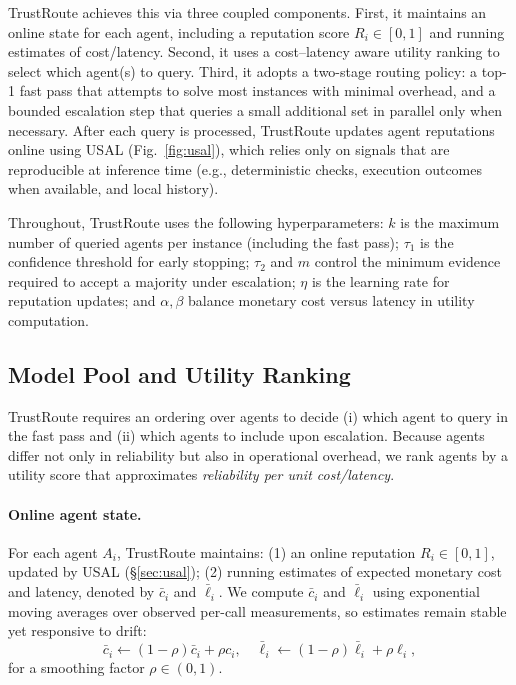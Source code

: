 \documentclass[acmsmall,screen,review,anonymous]{acmart}
\begin{document}
TrustRoute achieves this via three coupled components.
First, it maintains an online state for each agent, including a reputation score $R_i\in[0,1]$ and running estimates of cost/latency.
Second, it uses a cost--latency aware utility ranking to select which agent(s) to query.
Third, it adopts a two-stage routing policy:
a top-1 fast pass that attempts to solve most instances with minimal overhead,
and a bounded escalation step that queries a small additional set in parallel only when necessary.
After each query is processed, TrustRoute updates agent reputations online using USAL (Fig.~\ref{fig:usal}),
which relies only on signals that are reproducible at inference time (e.g., deterministic checks, execution outcomes when available, and local history).

Throughout, TrustRoute uses the following hyperparameters:
$k$ is the maximum number of queried agents per instance (including the fast pass);
$\tau_1$ is the confidence threshold for early stopping;
$\tau_2$ and $m$ control the minimum evidence required to accept a majority under escalation;
$\eta$ is the learning rate for reputation updates; and
$\alpha,\beta$ balance monetary cost versus latency in utility computation.

\subsection{Model Pool and Utility Ranking}
\label{sec:ranking}
TrustRoute requires an ordering over agents to decide (i) which agent to query in the fast pass and (ii) which agents to include upon escalation.
Because agents differ not only in reliability but also in operational overhead, we rank agents by a utility score that approximates
\emph{reliability per unit cost/latency}.

\paragraph{Online agent state.}
For each agent $A_i$, TrustRoute maintains:
(1) an online reputation $R_i\in[0,1]$, updated by USAL (\S\ref{sec:usal});
(2) running estimates of expected monetary cost and latency, denoted by $\bar{c}_i$ and $\bar{\ell}_i$.
We compute $\bar{c}_i$ and $\bar{\ell}_i$ using exponential moving averages over observed per-call measurements,
so estimates remain stable yet responsive to drift:
\[
\bar{c}_i \leftarrow (1-\rho)\bar{c}_i + \rho c_i,\quad
\bar{\ell}_i \leftarrow (1-\rho)\bar{\ell}_i + \rho \ell_i,
\]
for a smoothing factor $\rho\in(0,1)$.
\end{document}
